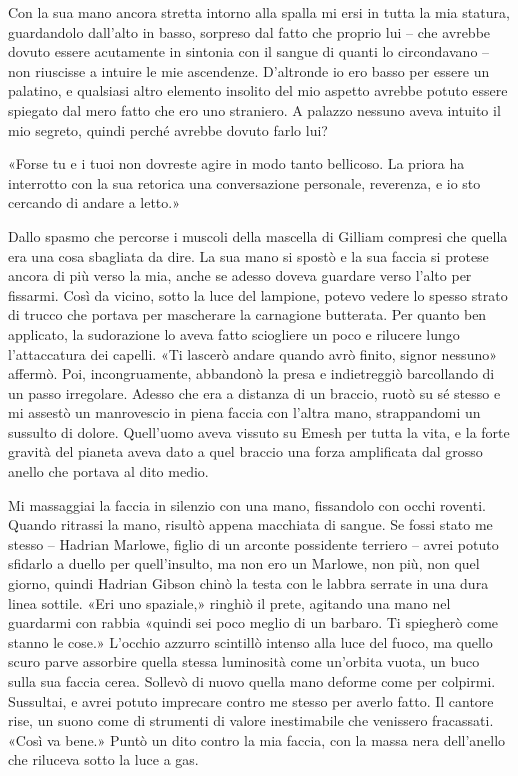 Con la sua mano ancora stretta intorno alla spalla mi ersi in tutta la
mia statura, guardandolo dall'alto in basso, sorpreso dal fatto che
proprio lui -- che avrebbe dovuto essere acutamente in sintonia con il
sangue di quanti lo circondavano -- non riuscisse a intuire le mie
ascendenze. D'altronde io ero basso per essere un palatino, e qualsiasi
altro elemento insolito del mio aspetto avrebbe potuto essere spiegato
dal mero fatto che ero uno straniero. A palazzo nessuno aveva intuito il
mio segreto, quindi perché avrebbe dovuto farlo lui?

«Forse tu e i tuoi non dovreste agire in modo tanto bellicoso. La priora
ha interrotto con la sua retorica una conversazione personale,
reverenza, e io sto cercando di andare a letto.»

Dallo spasmo che percorse i muscoli della mascella di Gilliam compresi
che quella era una cosa sbagliata da dire. La sua mano si spostò e la
sua faccia si protese ancora di più verso la mia, anche se adesso doveva
guardare verso l'alto per fissarmi. Così da vicino, sotto la luce del
lampione, potevo vedere lo spesso strato di trucco che portava per
mascherare la carnagione butterata. Per quanto ben applicato, la
sudorazione lo aveva fatto sciogliere un poco e rilucere lungo
l'attaccatura dei capelli. «Ti lascerò andare quando avrò finito, signor
nessuno» affermò. Poi, incongruamente, abbandonò la presa e indietreggiò
barcollando di un passo irregolare. Adesso che era a distanza di un
braccio, ruotò su sé stesso e mi assestò un manrovescio in piena faccia
con l'altra mano, strappandomi un sussulto di dolore. Quell'uomo aveva
vissuto su Emesh per tutta la vita, e la forte gravità del pianeta aveva
dato a quel braccio una forza amplificata dal grosso anello che portava
al dito medio.

Mi massaggiai la faccia in silenzio con una mano, fissandolo con occhi
roventi. Quando ritrassi la mano, risultò appena macchiata di sangue. Se
fossi stato me stesso -- Hadrian Marlowe, figlio di un arconte
possidente terriero -- avrei potuto sfidarlo a duello per quell'insulto,
ma non ero un Marlowe, non più, non quel giorno, quindi Hadrian Gibson
chinò la testa con le labbra serrate in una dura linea sottile. «Eri uno
spaziale,» ringhiò il prete, agitando una mano nel guardarmi con rabbia
«quindi sei poco meglio di un barbaro. Ti spiegherò come stanno le
cose.» L'occhio azzurro scintillò intenso alla luce del fuoco, ma quello
scuro parve assorbire quella stessa luminosità come un'orbita vuota, un
buco sulla sua faccia cerea. Sollevò di nuovo quella mano deforme come
per colpirmi. Sussultai, e avrei potuto imprecare contro me stesso per
averlo fatto. Il cantore rise, un suono come di strumenti di valore
inestimabile che venissero fracassati. «Così va bene.» Puntò un dito
contro la mia faccia, con la massa nera dell'anello che riluceva sotto
la luce a gas.

